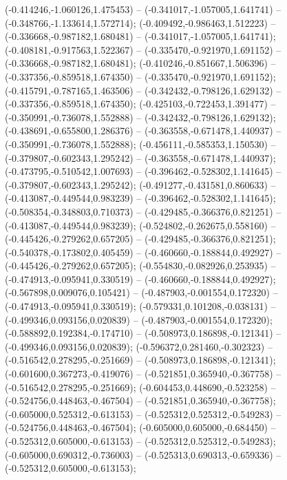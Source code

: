  (-0.414246,-1.060126,1.475453) -- (-0.341017,-1.057005,1.641741) -- (-0.348766,-1.133614,1.572714);
 (-0.409492,-0.986463,1.512223) -- (-0.336668,-0.987182,1.680481) -- (-0.341017,-1.057005,1.641741);
 (-0.408181,-0.917563,1.522367) -- (-0.335470,-0.921970,1.691152) -- (-0.336668,-0.987182,1.680481);
 (-0.410246,-0.851667,1.506396) -- (-0.337356,-0.859518,1.674350) -- (-0.335470,-0.921970,1.691152);
 (-0.415791,-0.787165,1.463506) -- (-0.342432,-0.798126,1.629132) -- (-0.337356,-0.859518,1.674350);
 (-0.425103,-0.722453,1.391477) -- (-0.350991,-0.736078,1.552888) -- (-0.342432,-0.798126,1.629132);
 (-0.438691,-0.655800,1.286376) -- (-0.363558,-0.671478,1.440937) -- (-0.350991,-0.736078,1.552888);
 (-0.456111,-0.585353,1.150530) -- (-0.379807,-0.602343,1.295242) -- (-0.363558,-0.671478,1.440937);
 (-0.473795,-0.510542,1.007693) -- (-0.396462,-0.528302,1.141645) -- (-0.379807,-0.602343,1.295242);
 (-0.491277,-0.431581,0.860633) -- (-0.413087,-0.449544,0.983239) -- (-0.396462,-0.528302,1.141645);
 (-0.508354,-0.348803,0.710373) -- (-0.429485,-0.366376,0.821251) -- (-0.413087,-0.449544,0.983239);
 (-0.524802,-0.262675,0.558160) -- (-0.445426,-0.279262,0.657205) -- (-0.429485,-0.366376,0.821251);
 (-0.540378,-0.173802,0.405459) -- (-0.460660,-0.188844,0.492927) -- (-0.445426,-0.279262,0.657205);
 (-0.554830,-0.082926,0.253935) -- (-0.474913,-0.095941,0.330519) -- (-0.460660,-0.188844,0.492927);
 (-0.567898,0.009076,0.105421) -- (-0.487903,-0.001554,0.172320) -- (-0.474913,-0.095941,0.330519);
 (-0.579331,0.101208,-0.038131) -- (-0.499346,0.093156,0.020839) -- (-0.487903,-0.001554,0.172320);
 (-0.588892,0.192384,-0.174710) -- (-0.508973,0.186898,-0.121341) -- (-0.499346,0.093156,0.020839);
 (-0.596372,0.281460,-0.302323) -- (-0.516542,0.278295,-0.251669) -- (-0.508973,0.186898,-0.121341);
 (-0.601600,0.367273,-0.419076) -- (-0.521851,0.365940,-0.367758) -- (-0.516542,0.278295,-0.251669);
 (-0.604453,0.448690,-0.523258) -- (-0.524756,0.448463,-0.467504) -- (-0.521851,0.365940,-0.367758);
 (-0.605000,0.525312,-0.613153) -- (-0.525312,0.525312,-0.549283) -- (-0.524756,0.448463,-0.467504);
 (-0.605000,0.605000,-0.684450) -- (-0.525312,0.605000,-0.613153) -- (-0.525312,0.525312,-0.549283);
 (-0.605000,0.690312,-0.736003) -- (-0.525313,0.690313,-0.659336) -- (-0.525312,0.605000,-0.613153);
